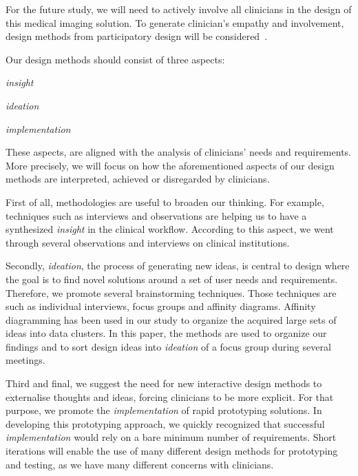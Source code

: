 For the future study, we will need to actively involve all clinicians in the design of this medical imaging solution.
To generate clinician's empathy and involvement, design methods from participatory design will be considered~\cite{10.1145/3025453.3025873}.

\hfill

\noindent
Our design methods should consist of three aspects:

\begin{itemize}
\begin{minipage}{0.3\linewidth}
\item {\it insight}
\end{minipage}
\begin{minipage}{0.3\linewidth}
\item {\it ideation}
\end{minipage}
\begin{minipage}{0.3\linewidth}
\item {\it implementation}
\end{minipage}
\end{itemize}

These aspects, are aligned with the analysis of clinicians' needs and requirements.
More precisely, we will focus on how the aforementioned aspects of our design methods are interpreted, achieved or disregarded by clinicians.

First of all, methodologies are useful to broaden our thinking.
For example, techniques such as interviews and observations are helping us to have a synthesized {\it insight} in the clinical workflow.
According to this aspect, we went through several observations and interviews on clinical institutions.

Secondly, {\it ideation}, the process of generating new ideas, is central to design where the goal is to find novel solutions around a set of user needs and requirements.
Therefore, we promote several brainstorming techniques.
Those techniques are such as individual interviews, focus groups and affinity diagrams.
Affinity diagramming has been used in our study to organize the acquired large sets of ideas into data clusters.
In this paper, the methods are used to organize our findings and to sort design ideas into {\it ideation} of a focus group during several meetings.

Third and final, we suggest the need for new interactive design methods to externalise thoughts and ideas, forcing clinicians to be more explicit.
For that purpose, we promote the {\it implementation} of rapid prototyping solutions.
In developing this prototyping approach, we quickly recognized that successful {\it implementation} would rely on a bare minimum number of requirements.
Short iterations will enable the use of many different design methods for prototyping and testing, as we have many different concerns with clinicians.


